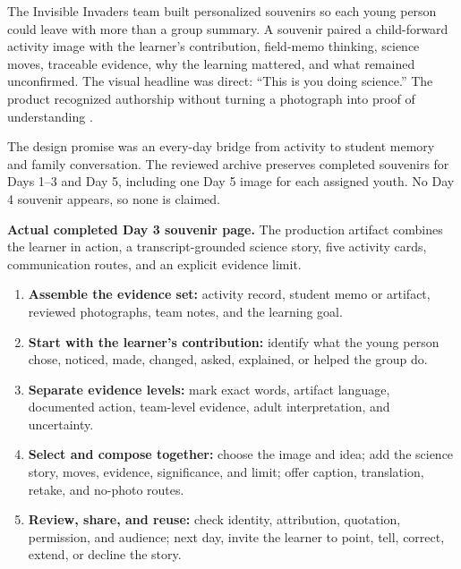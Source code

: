 

The Invisible Invaders team built personalized souvenirs so each young person could leave with more than a group summary. A souvenir paired a child-forward activity image with the learner's contribution, field-memo thinking, science moves, traceable evidence, why the learning mattered, and what remained unconfirmed. The visual headline was direct: ``This is you doing science.'' The product recognized authorship without turning a photograph into proof of understanding \citep{campEvidence2026}.

The design promise was an every-day bridge from activity to student memory and family conversation. The reviewed archive preserves completed souvenirs for Days 1--3 and Day 5, including one Day 5 image for each assigned youth. No Day 4 souvenir appears, so none is claimed.


\begin{center}

	\vspace{0.02in}
	\parbox{0.92\textwidth}{\centering\small\textbf{Actual completed Day 3 souvenir page.} The production artifact combines the learner in action, a transcript-grounded science story, five activity cards, communication routes, and an explicit evidence limit.}
\end{center}

\newpage
{}

\begin{enumerate}
	\item \textbf{Assemble the evidence set:} activity record, student memo or artifact, reviewed photographs, team notes, and the learning goal.
	\item \textbf{Start with the learner's contribution:} identify what the young person chose, noticed, made, changed, asked, explained, or helped the group do.
	\item \textbf{Separate evidence levels:} mark exact words, artifact language, documented action, team-level evidence, adult interpretation, and uncertainty.
	\item \textbf{Select and compose together:} choose the image and idea; add the science story, moves, evidence, significance, and limit; offer caption, translation, retake, and no-photo routes.
	\item \textbf{Review, share, and reuse:} check identity, attribution, quotation, permission, and audience; next day, invite the learner to point, tell, correct, extend, or decline the story.
\end{enumerate}

